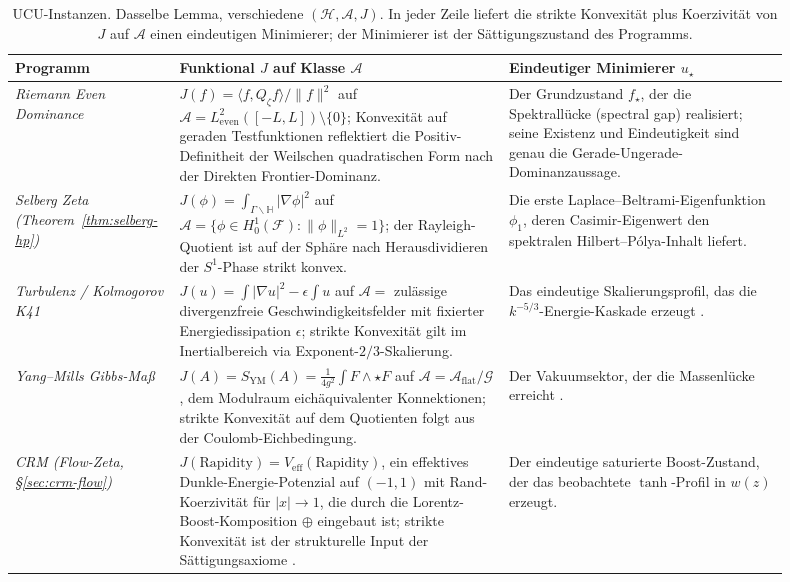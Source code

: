 \documentclass[11pt]{article}
\theoremstyle{definition}
\theoremstyle{remark}
\begin{document}
\renewcommand{\arraystretch}{1.25}
\begin{table}[htbp]
\centering
\scriptsize
\setlength{\tabcolsep}{3pt}
\begin{tabular}{|p{0.16\linewidth}|p{0.40\linewidth}|p{0.34\linewidth}|}
\hline
\textbf{Programm} & \textbf{Funktional $J$ auf Klasse $\mathcal{A}$} &
\textbf{Eindeutiger Minimierer $u_\star$} \\ \hline

\emph{Riemann Even Dominance} \cite{Geiger2026RHII}
& $J(f) = \langle f, Q_\zeta f \rangle / \|f\|^2$ auf
$\mathcal{A} = L^2_\mathrm{even}([-L,L]) \setminus \{0\}$;
Konvexität auf geraden Testfunktionen reflektiert die Positiv-Definitheit
der Weilschen quadratischen Form nach der Direkten Frontier-Dominanz.
& Der Grundzustand $f_\star$, der die Spektrallücke (spectral gap) realisiert;
seine Existenz und Eindeutigkeit sind genau die
Gerade-Ungerade-Dominanzaussage. \\ \hline

\emph{Selberg Zeta (Theorem~\ref{thm:selberg-hp})}
& $J(\phi) = \int_{\Gamma\backslash\mathbb{H}} |\nabla \phi|^2$
auf $\mathcal{A} = \{\phi \in H^1_0(\mathcal{F}) : \|\phi\|_{L^2}=1\}$;
der Rayleigh-Quotient ist auf der Sphäre nach Herausdividieren
der $S^1$-Phase strikt konvex.
& Die erste Laplace--Beltrami-Eigenfunktion $\phi_1$, deren
Casimir-Eigenwert den spektralen Hilbert--P\'olya-Inhalt liefert. \\ \hline

\emph{Turbulenz / Kolmogorov K41}
& $J(u) = \int |\nabla u|^2 - \epsilon \int u$ auf
$\mathcal{A} = $ zulässige divergenzfreie Geschwindigkeitsfelder mit
fixierter Energiedissipation $\epsilon$; strikte Konvexität gilt im
Inertialbereich via Exponent-$2/3$-Skalierung.
& Das eindeutige Skalierungsprofil, das die $k^{-5/3}$-Energie-Kaskade
erzeugt \cite{FSTTurbulence}. \\ \hline

\emph{Yang--Mills Gibbs-Maß}
& $J(A) = S_{\mathrm{YM}}(A) = \tfrac{1}{4g^2}\int F \wedge {\star F}$
auf $\mathcal{A} = \mathcal{A}_{\mathrm{flat}} / \mathcal{G}$, dem
Modulraum eichäquivalenter Konnektionen; strikte Konvexität auf
dem Quotienten folgt aus der Coulomb-Eichbedingung.
& Der Vakuumsektor, der die Massenlücke
erreicht \cite{FSTYangMills}. \\ \hline

\emph{CRM (Flow-Zeta, \S\ref{sec:crm-flow})}
& $J(\mathrm{Rapidity}) = V_{\mathrm{eff}}(\mathrm{Rapidity})$, ein
effektives Dunkle-Energie-Potenzial auf $(-1,1)$ mit Rand-Koerzivität für $|x| \to 1$,
die durch die Lorentz-Boost-Komposition $\oplus$ eingebaut ist; strikte Konvexität
ist der strukturelle Input der Sättigungsaxiome \cite{CRMV}.
& Der eindeutige saturierte Boost-Zustand, der das beobachtete $\tanh$-Profil in
$w(z)$ erzeugt. \\ \hline

\end{tabular}
\caption{UCU-Instanzen. Dasselbe Lemma, verschiedene
$(\mathcal{H},\mathcal{A},J)$. In jeder Zeile liefert die strikte Konvexität
plus Koerzivität von $J$ auf $\mathcal{A}$ einen eindeutigen
Minimierer; der Minimierer ist der Sättigungszustand des
Programms.}
\label{tab:ucu-instances}
\end{table}
\end{document}
